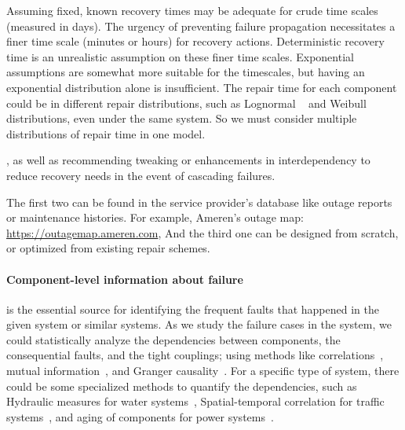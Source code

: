 
Assuming fixed, known recovery times may be adequate for crude time scales (measured in days). The urgency of preventing failure propagation necessitates a finer time scale (minutes or hours) for recovery actions. Deterministic recovery time is an unrealistic assumption on these finer time scales. Exponential assumptions are somewhat more suitable for the timescales, but having an exponential distribution alone is insufficient. The repair time for each component could be in different repair distributions, such as Lognormal ~\cite{l_c_cadwallader_review_2012} and Weibull ~\cite{ocansey_temperature-driven_2025} distributions, even under the same system. So we must consider multiple distributions of repair time in one model.

, as well as recommending tweaking or enhancements in interdependency to reduce recovery needs in the event of cascading failures. 

The first two can be found in the service provider's database like outage reports or maintenance histories. For example, Ameren's outage map: \url{https://outagemap.ameren.com}, %
And the third one can be designed from scratch, or optimized from existing repair schemes. 

\paragraph{Component-level information about failure} is the essential source for identifying the frequent faults that happened in the given system or similar systems. As we study the failure cases in the system, we could statistically analyze the dependencies between components, the consequential faults, and the tight couplings; using methods like correlations~\cite{}, mutual information~\cite{}, and Granger causality~\cite{}. For a specific type of system, there could be some specialized methods to quantify the dependencies, such as Hydraulic measures  for water systems~\cite{}, Spatial-temporal correlation for traffic systems~\cite{}, and aging of components for power systems~\cite{}. 


